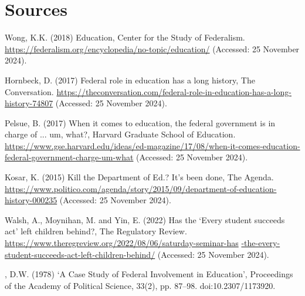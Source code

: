 \documentclass[11pt]{extarticle}
\begin{document}
\section{Sources}
\begin{hangparas}{.25in}{1}
Wong, K.K. (2018) Education, Center for the Study of Federalism. \url{https://federalism.org/encyclopedia/no-topic/education/} (Accessed: 25 November 2024).
\end{hangparas}
\par \vspace{0.5cm}
\begin{hangparas}{.25in}{1}
Hornbeck, D. (2017) Federal role in education has a long history, The Conversation. \url{https://theconversation.com/federal-role-in-education-has-a-long-history-74807} (Accessed: 25 November 2024). 
\end{hangparas}
\par \vspace{0.5cm}
\begin{hangparas}{.25in}{1}
Pelsue, B. (2017) When it comes to education, the federal government is in charge of ... um, what?, Harvard Graduate School of Education. \url{https://www.gse.harvard.edu/ideas/ed-magazine/17/08/when-it-comes-education-federal-government-charge-um-what} (Accessed: 25 November 2024). 
\end{hangparas}
\par \vspace{0.5cm}
\begin{hangparas}{.25in}{1}
Kosar, K. (2015) Kill the Department of Ed.? It’s been done, The Agenda. \url{https://www.politico.com/agenda/story/2015/09/department-of-education-history-000235} (Accessed: 25 November 2024). 
\end{hangparas}
\par \vspace{0.5cm}
\begin{hangparas}{.25in}{1}
Walsh, A., Moynihan, M. and Yin, E. (2022) Has the ‘Every student succeeds act’ left children behind?, The Regulatory Review. \url{https://www.theregreview.org/2022/08/06/saturday-seminar-has} \url{-the-every-student-succeeds-act-left-children-behind/} (Accessed: 25 November 2024). 
\end{hangparas}
\par \vspace{0.5cm}
\begin{hangparas}{.25in}{1}
, D.W. (1978) ‘A Case Study of Federal Involvement in Education’, Proceedings of the Academy of Political Science, 33(2), pp. 87–98. doi:10.2307/1173920. 
\end{hangparas}
\end{document}
